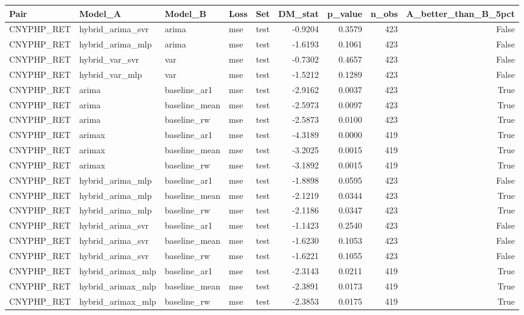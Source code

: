 \begin{tabular}{lllllrrrr}
\toprule
Pair & Model_A & Model_B & Loss & Set & DM_stat & p_value & n_obs & A_better_than_B_5pct \\
\midrule
CNYPHP_RET & hybrid_arima_svr & arima & mse & test & -0.9204 & 0.3579 & 423 & False \\
CNYPHP_RET & hybrid_arima_mlp & arima & mse & test & -1.6193 & 0.1061 & 423 & False \\
CNYPHP_RET & hybrid_var_svr & var & mse & test & -0.7302 & 0.4657 & 423 & False \\
CNYPHP_RET & hybrid_var_mlp & var & mse & test & -1.5212 & 0.1289 & 423 & False \\
CNYPHP_RET & arima & baseline_ar1 & mse & test & -2.9162 & 0.0037 & 423 & True \\
CNYPHP_RET & arima & baseline_mean & mse & test & -2.5973 & 0.0097 & 423 & True \\
CNYPHP_RET & arima & baseline_rw & mse & test & -2.5873 & 0.0100 & 423 & True \\
CNYPHP_RET & arimax & baseline_ar1 & mse & test & -4.3189 & 0.0000 & 419 & True \\
CNYPHP_RET & arimax & baseline_mean & mse & test & -3.2025 & 0.0015 & 419 & True \\
CNYPHP_RET & arimax & baseline_rw & mse & test & -3.1892 & 0.0015 & 419 & True \\
CNYPHP_RET & hybrid_arima_mlp & baseline_ar1 & mse & test & -1.8898 & 0.0595 & 423 & False \\
CNYPHP_RET & hybrid_arima_mlp & baseline_mean & mse & test & -2.1219 & 0.0344 & 423 & True \\
CNYPHP_RET & hybrid_arima_mlp & baseline_rw & mse & test & -2.1186 & 0.0347 & 423 & True \\
CNYPHP_RET & hybrid_arima_svr & baseline_ar1 & mse & test & -1.1423 & 0.2540 & 423 & False \\
CNYPHP_RET & hybrid_arima_svr & baseline_mean & mse & test & -1.6230 & 0.1053 & 423 & False \\
CNYPHP_RET & hybrid_arima_svr & baseline_rw & mse & test & -1.6221 & 0.1055 & 423 & False \\
CNYPHP_RET & hybrid_arimax_mlp & baseline_ar1 & mse & test & -2.3143 & 0.0211 & 419 & True \\
CNYPHP_RET & hybrid_arimax_mlp & baseline_mean & mse & test & -2.3891 & 0.0173 & 419 & True \\
CNYPHP_RET & hybrid_arimax_mlp & baseline_rw & mse & test & -2.3853 & 0.0175 & 419 & True \\

\end{tabular}
